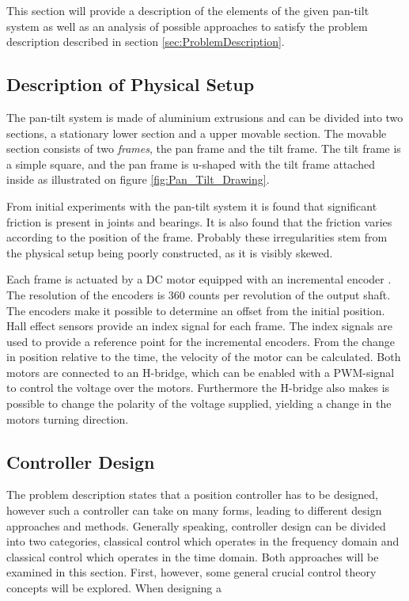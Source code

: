 \documentclass[../../main.tex]{subfiles}
\begin{document}
This section will provide a description of the elements of the given pan-tilt system as well as an analysis of possible approaches to satisfy the problem description described in section \ref{sec:ProblemDescription}.

\subsection{Description of Physical Setup}
The pan-tilt system is made of aluminium extrusions and can be divided into two sections, a stationary lower section and a upper movable section. The movable section consists of two \textit{frames}, the pan frame and the tilt frame. The tilt frame is a simple square, and the pan frame is u-shaped with the tilt frame attached inside as illustrated on figure \ref{fig:Pan_Tilt_Drawing}.

From initial experiments with the pan-tilt system it is found that significant friction is present in joints and bearings. It is also found that the friction varies according to the position of the frame. Probably these irregularities stem from the physical setup being poorly constructed, as it is visibly skewed.  

Each frame is actuated by a DC motor equipped with an incremental encoder \cite{}. The resolution of the encoders is 360 counts per revolution of the output shaft. The encoders make it possible to determine an offset from the initial position. Hall effect sensors \cite{} provide an index signal for each frame. The index signals are used to provide a reference point for the incremental encoders. From the change in position relative to the time, the velocity of the motor can be calculated. Both motors are connected to an H-bridge, which can be enabled with a PWM-signal to control the voltage over the motors. Furthermore the H-bridge also makes is possible to change the polarity of the voltage supplied, yielding a change in the motors turning direction.

\subsection{Controller Design}
The problem description states that a position controller has to be designed, however such a controller can take on many forms, leading to different design approaches and methods. Generally speaking, controller design can be divided into two categories, classical control which operates in the frequency domain and classical control which operates in the time domain. Both approaches will be examined in this section. First, however, some general crucial control theory concepts will be explored.
When designing a 
\end{document}
